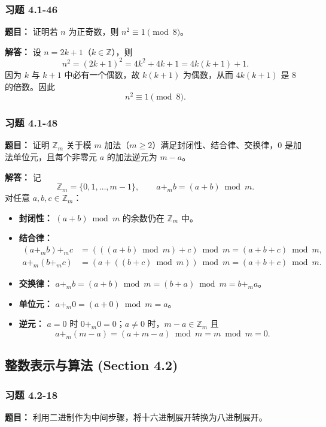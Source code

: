 \documentclass[11pt,UTF8]{article}
\begin{document}
\subsubsection*{习题 4.1-46}
\textbf{题目：} 证明若 $n$ 为正奇数，则 $n^2\equiv 1\pmod 8$。

\textbf{解答：} 设 $n=2k+1$（$k\in\mathbb{Z}$），则
\[ n^2=(2k+1)^2=4k^2+4k+1=4k(k+1)+1. \]
因为 $k$ 与 $k+1$ 中必有一个偶数，故 $k(k+1)$ 为偶数，从而 $4k(k+1)$ 是 $8$ 的倍数。因此
\[ n^2\equiv 1\pmod 8. \]

\subsubsection*{习题 4.1-48}
\textbf{题目：} 证明 $\mathbb{Z}_m$ 关于模 $m$ 加法（$m\ge 2$）满足封闭性、结合律、交换律，$0$ 是加法单位元，且每个非零元 $a$ 的加法逆元为 $m-a$。

\textbf{解答：} 记
\[ \mathbb{Z}_m=\{0,1,\dots,m-1\},\qquad a+_m b=(a+b)\bmod m. \]
对任意 $a,b,c\in\mathbb{Z}_m$：
\begin{itemize}
    \item \textbf{封闭性：} $(a+b)\bmod m$ 的余数仍在 $\mathbb{Z}_m$ 中。
    \item \textbf{结合律：}
    \begin{align*}
    (a+_m b)+_m c &=(((a+b)\bmod m)+c)\bmod m=(a+b+c)\bmod m,\\
    a+_m(b+_m c) &=(a+((b+c)\bmod m))\bmod m=(a+b+c)\bmod m.
    \end{align*}
    \item \textbf{交换律：} $a+_m b=(a+b)\bmod m=(b+a)\bmod m=b+_m a$。
    \item \textbf{单位元：} $a+_m 0=(a+0)\bmod m=a$。
    \item \textbf{逆元：} $a=0$ 时 $0+_m 0=0$；$a\neq 0$ 时，$m-a\in\mathbb{Z}_m$ 且
    \[ a+_m(m-a)=(a+m-a)\bmod m=m\bmod m=0. \]
\end{itemize}



\subsection{整数表示与算法 (Section 4.2)}

\subsubsection*{习题 4.2-18}
\textbf{题目：} 利用二进制作为中间步骤，将十六进制展开转换为八进制展开。
\end{document}
